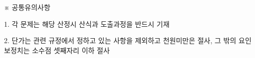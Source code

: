 \begin{framedtext}
※ 공통유의사항 \par
1. 각 문제는 해당 산정시 산식과 도출과정을 반드시 기재 \par
2. 단가는 관련 규정에서 정하고 있는 사항을 제외하고 천원미만은 절사, 그 밖의 요인 보정치는 소수점 셋째자리 이하 절사 \par
\end{framedtext}

